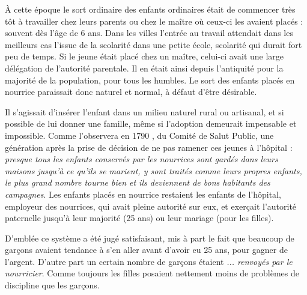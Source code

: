  À cette époque le sort ordinaire des enfants ordinaires était de commencer très tôt à travailler chez leurs parents ou chez le maître où ceux-ci les avaient placés : souvent dès l'âge de 6 ans. Dans les villes l'entrée au travail attendait dans les meilleurs cas l'issue de la scolarité dans une petite école, scolarité qui durait fort peu de temps. Si le jeune était placé chez un maître, celui-ci avait une large délégation de l'autorité parentale. Il en était ainsi depuis l'antiquité pour la majorité de la population, pour tous les humbles. Le sort des enfants placés en nourrice paraissait donc naturel et normal, à défaut d'être désirable.

 Il s'agissait d'insérer l'enfant dans un milieu naturel rural ou artisanal, et si possible de lui donner une famille, même si l'adoption demeurait impensable et impossible. Comme l'observera en 1790 , du Comité de Salut Public, une génération après la prise de décision de ne pas ramener ces jeunes à l'hôpital : \emph{presque tous les enfants conservés par les nourrices sont gardés dans leurs maisons jusqu'à ce qu'ils se marient, y sont traités comme leurs propres enfants, le plus grand nombre tourne bien et ils deviennent de bons habitants des campagnes}. Les enfants placés en nourrice restaient les enfants de l'hôpital, employeur des nourrices, qui avait pleine autorité sur eux, et exerçait l'autorité paternelle jusqu'à leur majorité (25 ans) ou leur mariage (pour les filles). 

 D'emblée ce système a été jugé satisfaisant, mis à part le fait que beaucoup de garçons avaient tendance à s'en aller avant d'avoir eu 25 ans, pour gagner de l'argent. D'autre part un certain nombre de garçons étaient \emph{... renvoyés par le nourricier}. Comme toujours les filles posaient nettement moins de problèmes de discipline que les garçons. 

